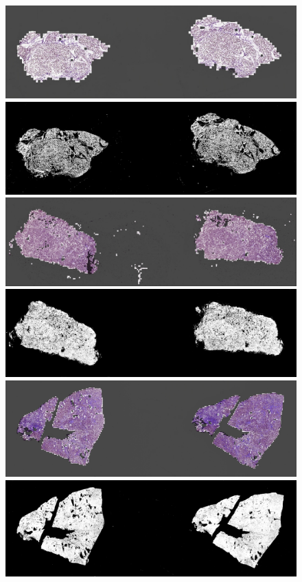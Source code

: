 \begin{enumerate}
    \begin{figure}
        \begin{center}
        	\vspace{0.05cm}
		    \includegraphics[width=0.48\linewidth]{figs/introduction/subs/challenges/evaluate_slides/TCGA-EL-A3TB-11A-01-TS1.6E0966C9-1552-4B30-9008-8ACF737CA8C3__2000_generated_mask.jpg}
		    \vspace{0.05cm}
        	\includegraphics[width=0.48\linewidth]{figs/introduction/subs/challenges/evaluate_slides/TCGA-EL-A3TB-11A-01-TS1.6E0966C9-1552-4B30-9008-8ACF737CA8C3__2000_masked.png}
        	\vspace{0.05cm}
            \includegraphics[width=0.48\linewidth]{figs/introduction/subs/challenges/evaluate_slides/TCGA-DJ-A1QG-01A-01-TSA.04c62c21-dd45-49ea-a74f-53822defe097__2000_generated_mask.jpg}
            \includegraphics[width=0.48\linewidth]{figs/introduction/subs/challenges/evaluate_slides/TCGA-DJ-A1QG-01A-01-TSA.04c62c21-dd45-49ea-a74f-53822defe097__2000_masked.png}
            \vspace{0.05cm}
            \includegraphics[width=0.48\linewidth]{figs/introduction/subs/challenges/evaluate_slides/TCGA-ET-A39O-01A-01-TSA.3829C900-7597-4EA9-AFC7-AA238221CE69_7000_generated_mask.jpg}
            \includegraphics[width=0.48\linewidth]{figs/introduction/subs/challenges/evaluate_slides/TCGA-ET-A39O-01A-01-TSA.3829C900-7597-4EA9-AFC7-AA238221CE69_7000_masked.png}

\end{center}
\end{figure}
\end{enumerate}
